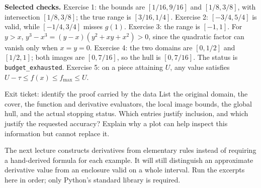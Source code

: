 \textbf{Selected checks.} Exercise 1: the bounds are $[1/16,9/16]$ and
$[1/8,3/8]$, with intersection $[1/8,3/8]$; the true range is
$[3/16,1/4]$. Exercise 2: $[-3/4,5/4]$ is valid, while
$[-1/4,3/4]$ misses $g(1)$. Exercise 3: the range is $[-1,1]$.
For $y>x$, $y^3-x^3=(y-x)(y^2+xy+x^2)>0$, since the quadratic factor
can vanish only when $x=y=0$. Exercise 4: the two domains are $[0,1/2]$
and $[1/2,1]$; both images are $[0,7/16]$, so the hull is $[0,7/16]$.
The status is \texttt{budget\_exhausted}. Exercise 5: on a piece attaining
$U$, any value satisfies $U-\tau\le f(x)\le f_{\max}\le U$.

\begin{question}{Exit ticket: identify the proof carried by the data}
List the original domain, the cover, the function and derivative evaluators,
the local image bounds, the global hull, and the actual stopping status.
Which entries justify inclusion, and which justify the requested accuracy?
Explain why a plot can help inspect this information but cannot replace it.
\end{question}

The next lecture constructs derivatives from elementary rules instead of
requiring a hand-derived formula for each example. It will still distinguish
an approximate derivative value from an enclosure valid on a whole interval.
Run the excerpts here in order; only Python's standard library is required.


